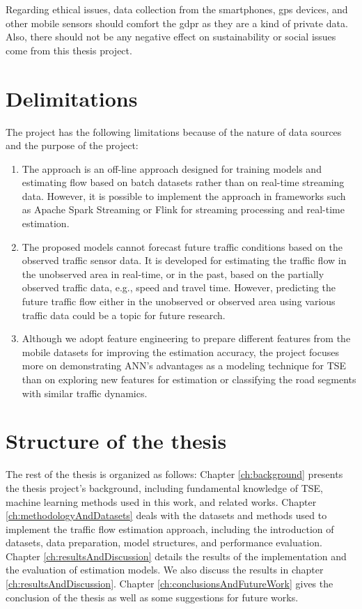 \documentclass[english]{kththesis}
\begin{document}
Regarding ethical issues, data collection from the smartphones, \gls{gps} devices, and other mobile sensors should comfort the \gls{gdpr} as they are a kind of private data. Also, there should not be any negative effect on sustainability or social issues come from this thesis project.

\section{Delimitations}
\label{sec:delimitations}
The project has the following limitations because of the nature of data sources and the purpose of the project:
\begin{enumerate}
    \item The approach is an off-line approach designed for training models and estimating flow based on batch datasets rather than on real-time streaming data. However, it is possible to implement the approach in frameworks such as Apache Spark Streaming or Flink for streaming processing and real-time estimation. 
    \item The proposed models cannot forecast future traffic conditions based on the observed traffic sensor data. It is developed for estimating the traffic flow in the unobserved area in real-time, or in the past, based on the partially observed traffic data, e.g., speed and travel time. However, predicting the future traffic flow either in the unobserved or observed area using various traffic data could be a topic for future research.
    \item Although we adopt feature engineering to prepare different features from the mobile datasets for improving the estimation accuracy, the project focuses more on demonstrating ANN's advantages as a modeling technique for TSE than on exploring new features for estimation or classifying the road segments with similar traffic dynamics.
\end{enumerate}


\section{Structure of the thesis}
\label{sec:structureOfThesis}
The rest of the thesis is organized as follows: Chapter \ref{ch:background} presents the thesis project's background, including fundamental knowledge of TSE, machine learning methods used in this work, and related works. Chapter \ref{ch:methodologyAndDatasets} deals with the datasets and methods used to implement the traffic flow estimation approach, including the introduction of datasets, data preparation, model structures, and performance evaluation. Chapter \ref{ch:resultsAndDiscussion} details the results of the implementation and the evaluation of estimation models. We also discuss the results in chapter \ref{ch:resultsAndDiscussion}. Chapter \ref{ch:conclusionsAndFutureWork} gives the conclusion of the thesis as well as some suggestions for future works.
\end{document}
